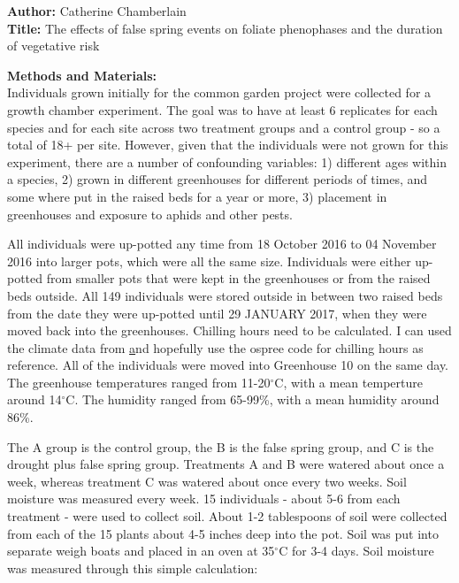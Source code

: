 \documentclass{article}\usepackage[]{graphicx}\usepackage[]{color}
\begin{document}
\renewcommand{\thetable}{\arabic{table}}
\renewcommand{\thefigure}{\arabic{figure}}
\renewcommand{\labelitemi}{$-$}

\textbf{Author:} Catherine Chamberlain \\
\textbf{Title:} The effects of false spring events on foliate phenophases and the duration of vegetative risk
\par


{\large\textbf{Methods and Materials:}}\\
Individuals grown initially for the common garden project were collected for a growth chamber experiment. The goal was to have at least 6 replicates for each species and for each site across two treatment groups and a control group - so a total of 18+ per site. However, given that the individuals were not grown for this experiment, there are a number of confounding variables: 1) different ages within a species, 2) grown in different greenhouses for different periods of times, and some where put in the raised beds for a year or more, 3) placement in greenhouses and exposure to aphids and other pests. 

All individuals were up-potted any time from 18 October 2016 to 04 November 2016 into larger pots, which were all the same size. Individuals were either up-potted from smaller pots that were kept in the greenhouses or from the raised beds outside. All 149 individuals were stored outside in between two raised beds from the date they were up-potted until 29 JANUARY 2017, when they were moved back into the greenhouses. Chilling hours need to be calculated. I can used the climate data from \href{http://labs.arboretum.harvard.edu/weather/} and hopefully use the ospree code for chilling hours as reference. All of the individuals were moved into Greenhouse 10 on the same day. The greenhouse temperatures ranged from 11-20$^{\circ}$C, with a mean temperture around 14$^{\circ}$C. The humidity ranged from 65-99\%, with a mean humidity around 86\%.

The A group is the control group, the B is the false spring group, and C is the drought plus false spring group. Treatments A and B were watered about once a week, whereas treatment C was watered about once every two weeks. Soil moisture was measured every week. 15 individuals - about 5-6 from each treatment - were used to collect soil. About 1-2 tablespoons of soil were collected from each of the 15 plants about 4-5 inches deep into the pot. Soil was put into separate weigh boats and placed in an oven at 35$^{\circ}$C for 3-4 days. Soil moisture was measured through this simple calculation:
\end{document}
